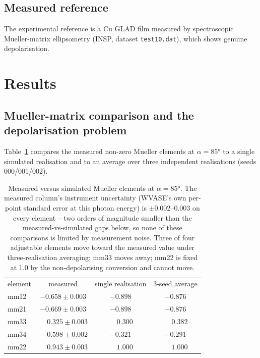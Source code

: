 \documentclass[aip,jcp,amsmath,amssymb,reprint]{revtex4-1}
\begin{document}
\subsection{Measured reference}
The experimental reference is a Cu GLAD film measured by spectroscopic
Mueller-matrix ellipsometry (INSP, dataset \texttt{test10.dat}), which shows
genuine depolarisation.

\section{Results}
\label{sec:results}

\subsection{Mueller-matrix comparison and the depolarisation problem}
\label{ssec:mueller}
Table~\ref{tab:mueller} compares the measured non-zero Mueller elements at
$\alpha = \ang{85}$ to a single simulated realisation and to an average over
three independent realisations (seeds 000/001/002).

\begin{table}[t]
\caption{Measured versus simulated Mueller elements at $\alpha = \ang{85}$.
The measured column's instrument uncertainty (WVASE's own per-point standard
error at this photon energy) is $\pm0.002$--$0.003$ on every element --
two orders of magnitude smaller than the measured-vs-simulated gaps below,
so none of these comparisons is limited by measurement noise. Three of four
adjustable elements move toward the measured value under three-realisation
averaging; mm33 moves away; mm22 is fixed at \num{1.0} by the
non-depolarising conversion and cannot move.}
\label{tab:mueller}
\begin{ruledtabular}
\begin{tabular}{lccc}
element & measured & single realisation & 3-seed average \\
\colrule
mm12 & $-0.658\pm0.003$ & $-0.898$ & $-0.876$ \\
mm21 & $-0.669\pm0.003$ & $-0.898$ & $-0.876$ \\
mm33 & $\phantom{-}0.325\pm0.003$ & $\phantom{-}0.300$ & $\phantom{-}0.382$ \\
mm34 & $\phantom{-}0.598\pm0.002$ & $-0.321$ & $-0.291$ \\
mm22 & $\phantom{-}0.943\pm0.003$ & $\phantom{-}1.000$ & $\phantom{-}1.000$ \\
\end{tabular}
\end{ruledtabular}
\end{table}
\end{document}
